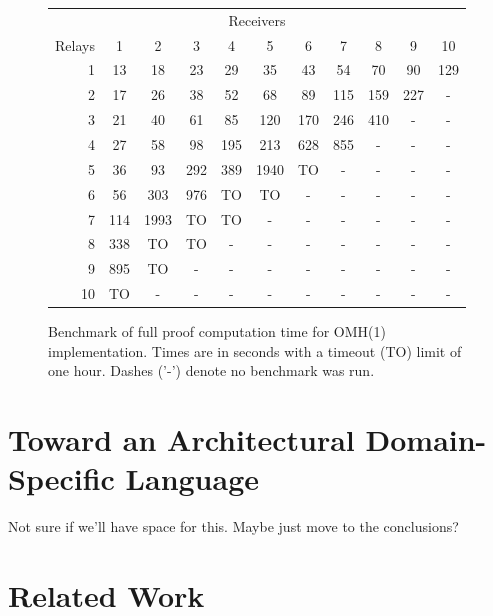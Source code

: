 \documentclass{llncs/llncs}
\begin{document}
\begin{figure}
  \centering
  \begin{tabular}{r||c|c|c|c|c|c|c|c|c|c|}
      \multicolumn{11}{c}{Receivers} \\
      \cline{2-11}
   Relays &   1 &   2 &   3 &   4 &   5 &   6 &   7 &   8 &   9 &   10 \\
      \hline \hline
      1   & 13  & 18  & 23  & 29  & 35  & 43  & 54  & 70  & 90  & 129 \\
      \hline
      2   & 17  & 26  & 38  & 52  & 68  & 89  & 115 & 159 & 227 & -   \\
      \hline
      3   & 21  & 40  & 61  & 85  & 120 & 170 & 246 & 410 & -   & -   \\
      \hline
      4   & 27  & 58  & 98  & 195 & 213 & 628 & 855 & -   & -   & -   \\
      \hline
      5   & 36  & 93  & 292 & 389 & 1940& TO  & -   & -   & -   & -   \\
      \hline
      6   & 56  & 303 & 976 & TO  & TO  & -   & -   & -   & -   & -   \\
      \hline
      7   & 114 & 1993& TO  & TO  & -   & -   & -   & -   & -   & -   \\
      \hline
      8   & 338 & TO  & TO  & -   & -   & -   & -   & -   & -   & -   \\
      \hline
      9   & 895 & TO  & -   & -   & -   & -   & -   & -   & -   & -   \\
      \hline
     10   & TO  & -   & -   & -   & -   & -   & -   & -   & -   & -   \\
      \hline
  \end{tabular}
  \label{fig:benchmark}
  \caption{Benchmark of full proof computation time for OMH(1) implementation. Times are in seconds with a timeout (TO) limit of one hour. Dashes ('-') denote no benchmark was run.}
\end{figure}

\section{Toward an Architectural Domain-Specific Language}\label{sec:adsl}
Not sure if we'll have space for this. Maybe just move to the conclusions?

\section{Related Work}\label{sec:related}
\end{document}
